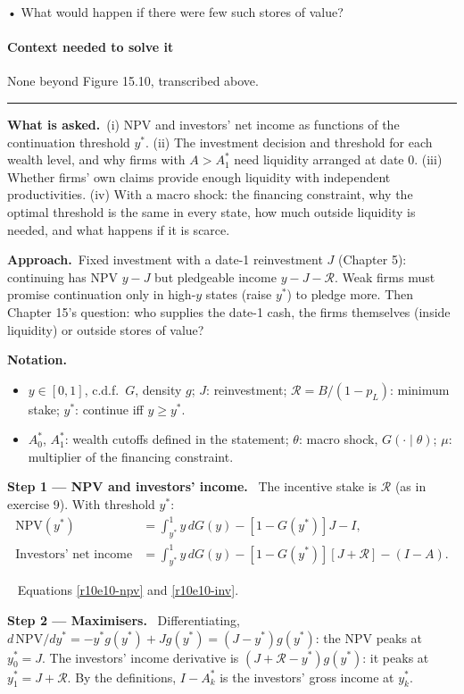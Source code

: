 \documentclass[11pt,a4paper]{article}
\newcommand{\notation}{\par\noindent\textbf{Notation.}}
\newcommand{\step}[2]{\par\medskip\noindent\textbf{Step #1 --- #2.}~}
\newcommand{\asked}{\par\medskip\noindent\textbf{What is asked.}~}
\newcommand{\approach}{\par\smallskip\noindent\textbf{Approach.}~}
\newcommand{\answer}[1]{\par\smallskip\noindent\fbox{\textbf{Answer\if\relax\detokenize{#1}\relax\else\ #1\fi.}}~}
\newcommand{\Rc}{\mathcal{R}}
\newcommand{\stmtend}{\par\endgroup\nopagebreak\noindent\rule{\linewidth}{0.4pt}\par\medskip}
\begin{document}
• What would happen if there were few such stores of value?

\paragraph{Context needed to solve it}

None beyond Figure 15.10, transcribed above.
\stmtend

\asked (i) NPV and investors' net income as functions of the continuation threshold $y^*$. (ii) The investment decision and threshold for each wealth level, and why firms with $A>A_1^*$ need liquidity arranged at date 0. (iii) Whether firms' own claims provide enough liquidity with independent productivities. (iv) With a macro shock: the financing constraint, why the optimal threshold is the same in every state, how much outside liquidity is needed, and what happens if it is scarce.

\approach Fixed investment with a date-1 reinvestment $J$ (Chapter 5): continuing has NPV $y-J$ but pledgeable income $y-J-\Rc$. Weak firms must promise continuation only in high-$y$ states (raise $y^*$) to pledge more. Then Chapter 15's question: who supplies the date-1 cash, the firms themselves (inside liquidity) or outside stores of value?

\notation
\begin{itemize}
  \item $y\in[0,1]$, c.d.f.\ $G$, density $g$; $J$: reinvestment; $\Rc=B/(1-p_L)$: minimum stake; $y^*$: continue iff $y\geq y^*$.
  \item $A_0^*$, $A_1^*$: wealth cutoffs defined in the statement; $\theta$: macro shock, $G(\cdot\mid\theta)$; $\mu$: multiplier of the financing constraint.
\end{itemize}

\step{1}{NPV and investors' income} The incentive stake is $\Rc$ (as in exercise 9). With threshold $y^*$:
\begin{align}
  \text{NPV}(y^*) &= \int_{y^*}^1y\,dG(y)-[1-G(y^*)]J-I, \label{r10e10-npv}\\
  \text{Investors' net income} &= \int_{y^*}^1y\,dG(y)-[1-G(y^*)][J+\Rc]-(I-A). \label{r10e10-inv}
\end{align}

\answer{(i)} Equations \eqref{r10e10-npv} and \eqref{r10e10-inv}.

\step{2}{Maximisers} Differentiating, $d\,\text{NPV}/dy^*=-y^*g(y^*)+Jg(y^*)=(J-y^*)g(y^*)$: the NPV peaks at $y_0^*=J$. The investors' income derivative is $(J+\Rc-y^*)g(y^*)$: it peaks at $y_1^*=J+\Rc$. By the definitions, $I-A_k^*$ is the investors' gross income at $y_k^*$.
\end{document}
